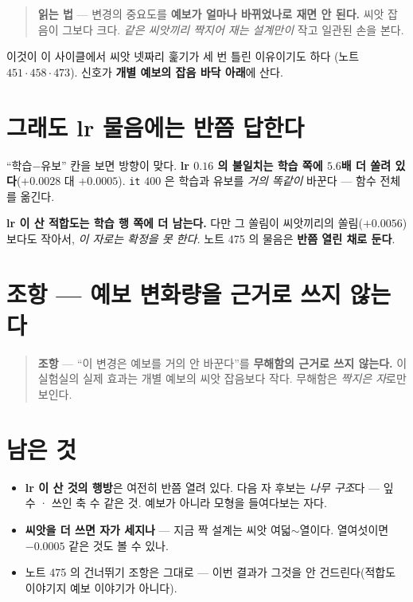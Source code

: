 \documentclass[11pt]{article}
\begin{document}
\begin{quote}
\textbf{읽는 법} --- 변경의 중요도를 \textbf{예보가 얼마나 바뀌었나로
재면 안 된다.} 씨앗 잡음이 그보다 크다. \emph{같은 씨앗끼리 짝지어
재는 설계만이} 작고 일관된 손을 본다.
\end{quote}

이것이 이 사이클에서 씨앗 넷짜리 훑기가 세 번 틀린 이유이기도 하다
(노트 $451 \cdot 458 \cdot 473$). 신호가 \textbf{개별 예보의 잡음 바닥
아래}에 산다.

\section{그래도 lr 물음에는 반쯤 답한다}

``학습$-$유보'' 칸을 보면 방향이 맞다. \textbf{lr $0.16$ 의 불일치는
학습 쪽에 $5.6$배 더 쏠려 있다}($+0.0028$ 대 $+0.0005$). \texttt{it}
$400$ 은 학습과 유보를 \emph{거의 똑같이} 바꾼다 --- 함수 전체를 옮긴다.

\textbf{lr 이 산 적합도는 학습 행 쪽에 더 남는다.} 다만 그 쏠림이
씨앗끼리의 쏠림($+0.0056$)보다도 작아서, \emph{이 자로는 확정을 못
한다.} 노트 475 의 물음은 \textbf{반쯤 열린 채로 둔다}.

\section*{조항 --- 예보 변화량을 근거로 쓰지 않는다}

\begin{quote}
\textbf{조항} --- ``이 변경은 예보를 거의 안 바꾼다''를 \textbf{무해함의
근거로 쓰지 않는다.} 이 실험실의 실제 효과는 개별 예보의 씨앗 잡음보다
작다. 무해함은 \emph{짝지은 자}로만 보인다.
\end{quote}

\section*{남은 것}

\begin{itemize}
\item \textbf{lr 이 산 것의 행방}은 여전히 반쯤 열려 있다. 다음 자
후보는 \emph{나무 구조}다 --- 잎 수 · 쓰인 축 수 같은 것. 예보가 아니라
모형을 들여다보는 자다.
\item \textbf{씨앗을 더 쓰면 자가 세지나} --- 지금 짝 설계는 씨앗
여덟$\sim$열이다. 열여섯이면 $-0.0005$ 같은 것도 볼 수 있나.
\item 노트 475 의 건너뛰기 조항은 그대로 --- 이번 결과가 그것을 안
건드린다(적합도 이야기지 예보 이야기가 아니다).
\end{itemize}
\end{document}
